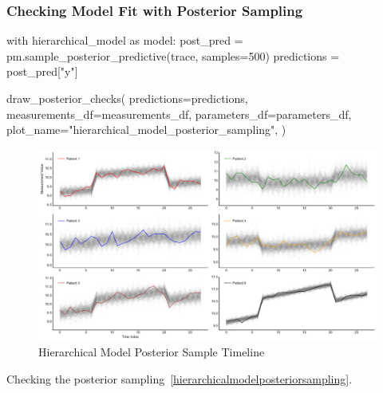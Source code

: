 \documentclass[12pt,a4paper,leqno]{report}
\theoremstyle{plain}
\theoremstyle{definition}
\theoremstyle{remark}
\begin{document}
\subsubsection{Checking Model Fit with Posterior Sampling}

\bigskip
\begin{pyverbatim}
with hierarchical_model as model:
    post_pred = pm.sample_posterior_predictive(trace, samples=500)
    predictions = post_pred["y"]

draw_posterior_checks(
    predictions=predictions,
    measurements_df=measurements_df,
    parameters_df=parameters_df,
    plot_name="hierarchical_model_posterior_sampling",
)
\end{pyverbatim}
\bigskip

\bigskip
\begin{figure}[H]
    \caption{Hierarchical Model Posterior Sample Timeline}
    \label{singlepatientposteriors}
    \bigskip
    \includegraphics[width=\textwidth,height=\textheight,keepaspectratio]{posterior_sample_timeline_hierarchical_model.pdf}
\end{figure}
\bigskip

Checking the posterior sampling\ \ref{hierarchicalmodelposteriorsampling}.

\end{document}

